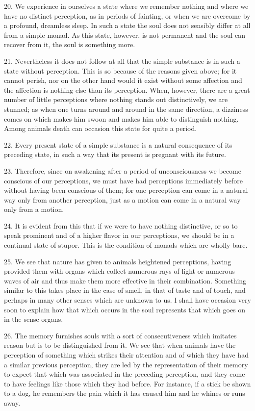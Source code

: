 20. We experience in ourselves a state where we remember nothing and
where we have no distinct perception, as in periods of fainting, or
when we are overcome by a profound, dreamless sleep. In such a state
the soul does not sensibly differ at all from a simple monad. As this
state, however, is not permanent and the soul can recover from it, the
soul is something more.

21. Nevertheless it does not follow at all that the simple substance
is in such a state without perception. This is so because of the
reasons given above; for it cannot perish, nor on the other hand would
it exist without some affection and the affection is nothing else than
its perception. When, however, there are a great number of little
perceptions where nothing stands out distinctively, we are stunned; as
when one turns around and around in the same direction, a dizziness
comes on which makes him swoon and makes him able to distinguish
nothing. Among animals death can occasion this state for quite a
period.

22. Every present state of a simple substance is a natural consequence
of its preceding state, in such a way that its present is pregnant
with its future.

23. Therefore, since on awakening after a period of 
unconsciousness we become conscious of our perceptions, we must have
had perceptions immediately before without having been conscious of
them; for one perception can come in a natural way only from another
perception, just as a motion can come in a natural way only from a
motion.

24. It is evident from this that if we were to have nothing
distinctive, or so to speak prominent and of a higher flavor in our
perceptions, we should be in a continual state of stupor. This is the
condition of monads which are wholly bare.

25. We see that nature has given to animals heightened perceptions,
having provided them with organs which collect numerous rays of light
or numerous waves of air and thus make them more effective in their
combination. Something similar to this takes place in the case of
smell, in that of taste and of touch, and perhaps in many other senses
which are unknown to us. I shall have occasion very soon to explain
how that which occurs in the soul represents that which goes on in the
sense-organs.

26. The memory furnishes souls with a sort of consecutiveness which
imitates reason but is to be distinguished from it. We see that when
animals have the perception of something which strikes their attention
and of which they have had a similar previous perception, they are led
by the representation of their memory to expect that which was
associated in the preceding perception, and they come to have feelings
like those which they had before. For instance, if a stick be shown to
a dog, he remembers the pain which it has caused him and he whines or
runs away.

